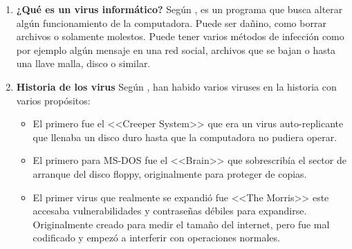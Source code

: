 \documentclass[stu, 12pt, letterpaper, donotrepeattitle, floatsintext, natbib, helv]{apa7}
\begin{document}
\begin{enumerate}
    \item \textbf{¿Qué es un virus informático?}
    Según \cite{virusInfo}, es un programa que busca alterar algún funcionamiento de la computadora. Puede ser dañino, como borrar archivos o solamente molestos. Puede tener varios métodos de infección como por ejemplo algún mensaje en una red social, archivos que se bajan o hasta una llave malla, disco o similar.
    
    \item \textbf{Historia de los virus}
    Según \cite{computerVirusHistory}, han habido varios viruses en la historia con varios propósitos:
    \begin{itemize}
        \item El primero fue el <<Creeper System>> que era un virus auto-replicante que llenaba un disco duro hasta que la computadora no pudiera operar.
        \item El primero para MS-DOS fue el <<Brain>> que sobrescribía el sector de arranque del disco floppy, originalmente para proteger de copias.
        \item El primer virus que realmente se expandió fue <<The Morris>> este accesaba vulnerabilidades y contraseñas débiles para expandirse. Originalmente creado para medir el tamaño del internet, pero fue mal codificado y empezó a interferir con operaciones normales.
    \end{itemize}
    

\end{enumerate}
\end{document}
